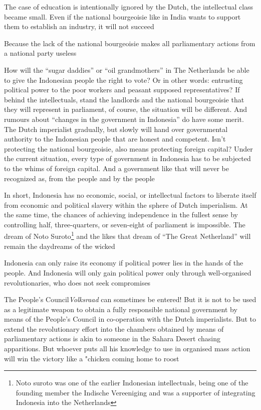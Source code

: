 The case of education is intentionally ignored by the Dutch, the intellectual class 
became small. Even if the national bourgeoisie like in India wants to support them 
to establish an industry, it will not succeed\nline

Because the lack of the national bourgeoisie makes all parliamentary actions from a national party useless\nline

How will the “sugar daddies” or “oil grandmothers” in The Netherlands be able 
to give the Indonesian people the right to vote? Or in other words: entrusting political 
power to the poor workers and peasant supposed representatives? If behind the intellectuals, 
stand the landlords and the national bourgeoisie that they will represent in parliament, 
of course, the situation will be different. And rumours about “changes in the government in Indonesia” 
do have some merit. The Dutch imperialist gradually, but slowly will hand over governmental authority 
to the Indonesian people that are honest and competent. Isn't protecting the national bourgeoisie, 
also means protecting foreign capital? Under the current situation, every type of government in 
Indonesia has to be subjected to the whims of foreign capital. And a government like that will never be recognized as, 
from the people and by the people\nline

In short, Indonesia has no economic, social, or intellectual factors to liberate itself 
from economic and political slavery within the sphere of Dutch imperialism. At the same 
time, the chances of achieving independence in the fullest sense by controlling half, 
three-quarters, or seven-eight of parliament is impossible. The dream of Noto Suroto\footnote[1]{ Noto suroto was one of the earlier Indonesian intellectuals, being one of the founding member the Indische Vereeniging and was a supporter of integrating Indonesia into the Netherlands}
and the likes that dream of “The Great Netherland” will remain the daydreams of the wicked\nline

Indonesia can only raise its economy if political power lies in the hands of the people. 
And Indonesia will only gain political power only through well-organised revolutionaries, who does not seek compromises\nline

The People's Council\emph{Volksraad} can sometimes be entered! But it is not to be used as a legitimate weapon 
to obtain a fully responsible national government by means of the People's Council in 
co-operation with the Dutch imperialists. But to extend the revolutionary effort into 
the chambers obtained by means of parliamentary actions is akin to someone in the Sahara Desert 
chasing apparitions. But whoever puts all his knowledge to use in organised mass action will win 
the victory like a "chicken coming home to roost\nline

